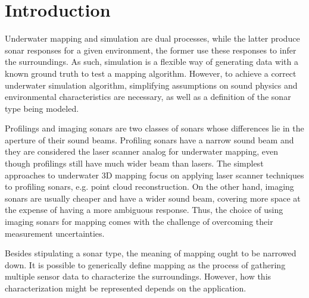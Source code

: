 \chapter{Introduction}


Underwater mapping and simulation are dual processes, while the latter produce
sonar responses for a given environment, the former use these responses to infer
the surroundings. As such, simulation is a flexible way of generating data with
a known ground truth to test a mapping algorithm. However, to achieve a correct
underwater simulation algorithm, simplifying assumptions on sound physics
and environmental characteristics are necessary, as well as a definition of the
sonar type being modeled.

Profilings and imaging sonars are two classes of sonars whose differences lie
in the aperture of their sound beams. Profiling sonars have a narrow sound beam
and they are considered the laser scanner analog for underwater mapping,
even though profilings still have much wider beam than lasers. The simplest
approaches to underwater 3D mapping focus on applying laser scanner techniques
to profiling sonars, e.g. point cloud reconstruction.
 On the other hand, imaging sonars are usually
cheaper and have a wider sound beam, covering more space at the expense of
having a more ambiguous response. Thus, the choice of using imaging
sonars for mapping comes with the challenge of overcoming their measurement
uncertainties.



Besides stipulating a sonar type, the meaning of mapping ought to be narrowed
down. It is possible to generically define mapping as the process of gathering
multiple sensor data to characterize the surroundings. However, how this
characterization might be represented depends on the application.

